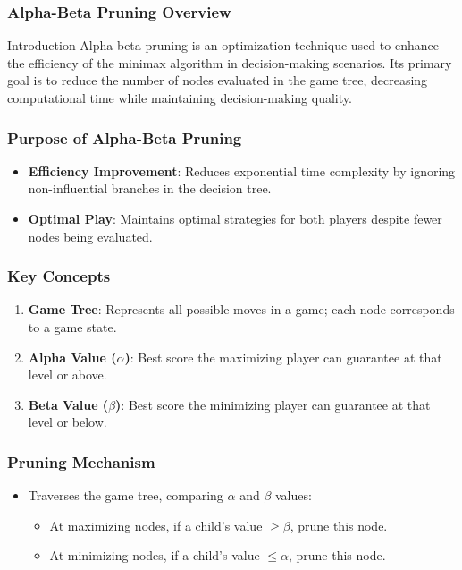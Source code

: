 \documentclass[aspectratio=169]{beamer}
\begin{document}
\begin{frame}[fragile]
    \frametitle{Alpha-Beta Pruning Overview}
    \begin{block}{Introduction}
        Alpha-beta pruning is an optimization technique used to enhance the efficiency of the minimax algorithm in decision-making scenarios.
        Its primary goal is to reduce the number of nodes evaluated in the game tree, decreasing computational time while maintaining decision-making quality.
    \end{block}
\end{frame}

\begin{frame}[fragile]
    \frametitle{Purpose of Alpha-Beta Pruning}
    \begin{itemize}
        \item \textbf{Efficiency Improvement}: Reduces exponential time complexity by ignoring non-influential branches in the decision tree.
        \item \textbf{Optimal Play}: Maintains optimal strategies for both players despite fewer nodes being evaluated.
    \end{itemize}
\end{frame}

\begin{frame}[fragile]
    \frametitle{Key Concepts}
    \begin{enumerate}
        \item \textbf{Game Tree}: Represents all possible moves in a game; each node corresponds to a game state.
        \item \textbf{Alpha Value ($\alpha$)}: Best score the maximizing player can guarantee at that level or above.
        \item \textbf{Beta Value ($\beta$)}: Best score the minimizing player can guarantee at that level or below.
    \end{enumerate}
\end{frame}

\begin{frame}[fragile]
    \frametitle{Pruning Mechanism}
    \begin{itemize}
        \item Traverses the game tree, comparing $\alpha$ and $\beta$ values:
        \begin{itemize}
            \item At maximizing nodes, if a child's value $\geq \beta$, prune this node.
            \item At minimizing nodes, if a child's value $\leq \alpha$, prune this node.
        \end{itemize}
    \end{itemize}
\end{frame}
\end{document}
